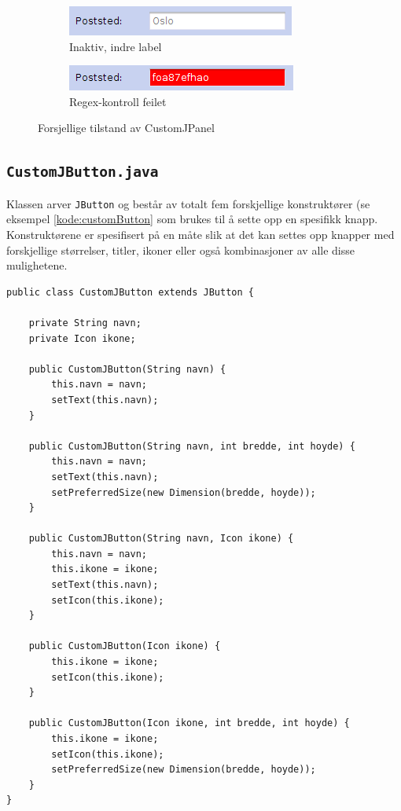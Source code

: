 \begin{figure}[ht!]
\centering
\begin{subfigure}[b]{1\textwidth}
\centering

\includegraphics[scale=0.7]{./img/produktdokumentasjon/swing_componenter/1.png}
\caption{Inaktiv, indre label}
\label{fig:custom1}
\end{subfigure}
\quad

\begin{subfigure}[b]{1\textwidth}
\centering
\includegraphics[scale=0.7]{./img/produktdokumentasjon/swing_componenter/2.png}
\caption{Regex-kontroll feilet}
\label{fig:custom2}
\end{subfigure}
\quad

\caption{Forsjellige tilstand av CustomJPanel}\label{fig:customjpane}
\end{figure}



\subsection{\texttt{CustomJButton.java}}
Klassen arver \texttt{JButton} og består av totalt fem forskjellige konstruktører (se eksempel \ref{kode:customButton} som brukes til å sette opp en spesifikk knapp. Konstruktørene er spesifisert på en måte slik at det kan settes opp knapper med forskjellige størrelser, titler, ikoner eller også kombinasjoner av alle disse mulighetene. 

\begin{lstlisting}[caption=De forskjellige konstruktørene i \texttt{CustomJButton}. ,label=kode:customButton]
public class CustomJButton extends JButton {

    private String navn;
    private Icon ikone;

    public CustomJButton(String navn) {
        this.navn = navn;
        setText(this.navn);
    }

    public CustomJButton(String navn, int bredde, int hoyde) {
        this.navn = navn;
        setText(this.navn);
        setPreferredSize(new Dimension(bredde, hoyde));
    }

    public CustomJButton(String navn, Icon ikone) {
        this.navn = navn;
        this.ikone = ikone;
        setText(this.navn);
        setIcon(this.ikone);
    }

    public CustomJButton(Icon ikone) {
        this.ikone = ikone;
        setIcon(this.ikone);
    }

    public CustomJButton(Icon ikone, int bredde, int hoyde) {
        this.ikone = ikone;
        setIcon(this.ikone);
        setPreferredSize(new Dimension(bredde, hoyde));
    }
}
\end{lstlisting}





